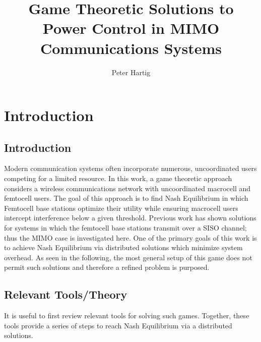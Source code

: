 \documentclass[12pt,a4paper]{report}
\title{Game Theoretic Solutions to Power Control in MIMO Communications Systems}
\author{Peter Hartig}
\begin{document}
\maketitle

%
\tableofcontents
\newpage

\chapter{Introduction}
\section{Introduction}
Modern communication systems often incorporate numerous, uncoordinated users competing for a limited resource.
In this work, a game theoretic approach considers a wireless communications network with uncoordinated  macrocell and femtocell users. The goal of this approach is to find Nash Equilibrium in which Femtocell base stations optimize their utility while ensuring macrocell users intercept interference below a given threshold. 
Previous work has shown solutions for systems in which the femtocell base stations transmit over a SISO channel; thus the MIMO case is investigated here. 
One of the primary goals of this work is to achieve Nash Equilibrium via distributed solutions which minimize system overhead. As seen in the following, the most general setup of this game does not permit such solutions and therefore a refined problem is purposed.


\section{Relevant Tools/Theory}

It is useful to first review relevant tools for solving such games. Together, these tools provide a series of steps to reach Nash Equilibrium via a distributed solutions. 
\end{document}
